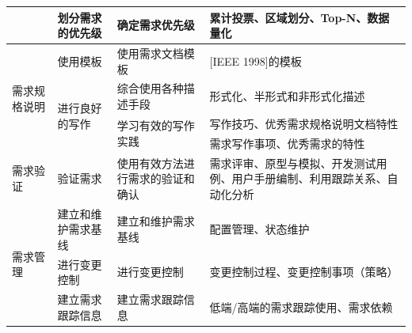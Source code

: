 \begin{center}
\begin{longtable}{|m{2cm}|m{3.5cm}|m{3.2cm}|m{4.6cm}|}
                                 & 划分需求的优先级                    & 确定需求优先级                          & 累计投票、区域划分、Top-N、数据量化                      \\ \hline
        \multirow{4}{*}{需求规格说明}  & 使用模板                        & 使用需求文档模板                         & {[}IEEE 1998{]}的模板                        \\ \cline{2-4} 
                                 & \multirow{3}{*}{进行良好的写作}    & 综合使用各种描述手段                       & 形式化、半形式和非形式化描述                            \\ \cline{3-4} 
                                 &                             & \multirow{2}{*}{学习有效的写作实践}       & 写作技巧、优秀需求规格说明文档特性                         \\ \cline{4-4} 
                                 &                             &                                  & 需求写作事项、优秀需求的特性                            \\ \hline
        需求验证                     & 验证需求                        & 使用有效方法进行需求的验证和确认                 & 需求评审、原型与模拟、开发测试用例、用户手册编制、利用跟踪关系、自动化分析     \\ \hline
        \multirow{3}{*}{需求管理}    & 建立和维护需求基线                   & 建立和维护需求基线                        & 配置管理、状态维护                                 \\ \cline{2-4} 
                                 & 进行变更控制                      & 进行变更控制                           & 变更控制过程、变更控制事项（策略）                         \\ \cline{2-4} 
                                 & 建立需求跟踪信息                    & 建立需求跟踪信息                         & 低端/高端的需求跟踪使用、需求依赖                         \\ \hline
    \end{longtable}
\end{center}
\vspace{-3.7em}


